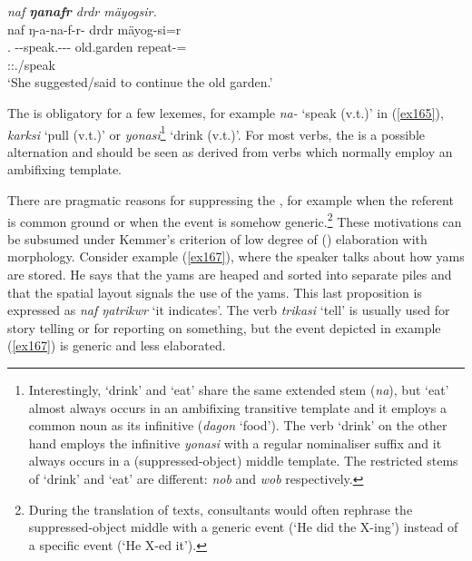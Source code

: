 \begin{exe}
	\ex \emph{naf \textbf{ŋanafr} drdr mäyogsir.}\\
	\glll naf ŋ-a-na-f-r-\Zero{} drdr mäyog-si=r\\
	\Tsg.\Erg{} \M-\Vc-speak.\Rs-\Ndu-\Lk-\Stsg{} old.garden repeat-\Nmlz=\Purp\\
	{} \footnotesize{\Stsg:\Sbj:\Nonpast.\Ipfv/speak} {} {}\\
	\trans `She suggested/said to continue the old garden.' 
	\label{ex165}
\end{exe}

The   is obligatory for a few lexemes, for example \emph{na-} `speak (v.t.)' in (\ref{ex165}), \emph{karksi} `pull (v.t.)' or \emph{yonasi}\footnote{Interestingly, `drink' and `eat' share the same extended stem (\emph{na}), but `eat' almost always occurs in an ambifixing transitive template and it employs a common noun as its infinitive (\emph{dagon} `food'). The verb `drink' on the other hand employs the infinitive \emph{yonasi} with a regular nominaliser suffix and it always occurs in a (suppressed-object) middle template. The restricted stems of `drink' and `eat' are different: \emph{nob} and \emph{wob} respectively.} `drink (v.t.)'. For most verbs, the   is a possible alternation and should be seen as derived from verbs which normally employ an ambifixing  template.%

There are pragmatic reasons for suppressing the , for example when the referent is common ground or when the event is somehow generic.\footnote{During the translation of texts, consultants would often rephrase the suppressed-object middle with a generic event (`He did the X-ing') instead of a specific event (`He X-ed it').} These motivations can be subsumed under Kemmer's criterion of low degree of () elaboration with  morphology. Consider example (\ref{ex167}), where the speaker talks about how yams are stored. He says that the yams are heaped and sorted into separate piles and that the spatial layout signals the use of the yams. This last proposition is expressed as \emph{naf ŋatrikwr} `it indicates'. The verb \emph{trikasi} `tell' is usually used for story telling or for reporting on something, but the event depicted in example (\ref{ex167}) is generic and less elaborated.

